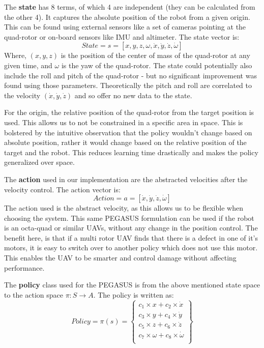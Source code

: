 \documentclass[hidelinks,BTech]{iitmdiss}
\begin{document}
The {\bf state} has 8 terms, of which 4 are independent (they can be calculated from the other 4). It captures the absolute position of the robot from a given origin. This can be found using external sensors like a set of cameras pointing at the quad-rotor or on-board sensors like IMU and altimeter. The state vector is:
\begin{equation}
  State = s = [x, y, z, \omega, \dot{x}, \dot{y}, \dot{z}, \dot{\omega}]
\end{equation}
Where, $(x, y, z)$ is the position of the center of mass of the quad-rotor at any given time, and $\omega$ is the yaw of the quad-rotor. The state could potentially also include the roll and pitch of the quad-rotor - but no significant improvement was found using those parameters. Theoretically the pitch and roll are correlated to the velocity $(\dot{x}, \dot{y}, \dot{z})$ and so offer no new data to the state.

For the origin, the relative position of the quad-rotor from the target position is used. This allows us to not be constrained in a specific area in space. This is bolstered by the intuitive observation that the policy wouldn't change based on absolute position, rather it would change based on the relative position of the target and the robot. This reduces learning time drastically and makes the policy generalized over space.

The {\bf action} used in our implementation are the abstracted velocities after the velocity control. The action vector is:
\begin{equation}
  Action = a = [\dot{x}, \dot{y}, \dot{z}, \dot{\omega}]
\end{equation}
The action used is the abstract velocity, as this allows us to be flexible when choosing the system. This same PEGASUS formulation can be used if the robot is an octa-quad or similar UAVs, without any change in the position control. The benefit here, is that if a multi rotor UAV finds that there is a defect in one of it's motors, it is easy to switch over to another policy which does not use this motor. This enables the UAV to be smarter and control damage without affecting performance.

The {\bf policy} class used for the PEGASUS is from the above mentioned state space to the action space $\pi: S \rightarrow A$. The policy is written as:
\begin{equation}
  Policy = \pi(s) = \left\{
    \begin{array}{c}
      c_1 \times x + c_2 \times \dot{x} \\
      c_3 \times y + c_4 \times \dot{y} \\
      c_5 \times z + c_6 \times \dot{z} \\
      c_7 \times \omega + c_8 \times \dot{\omega} \\
    \end{array}
  \right\}
\end{equation}
\end{document}

